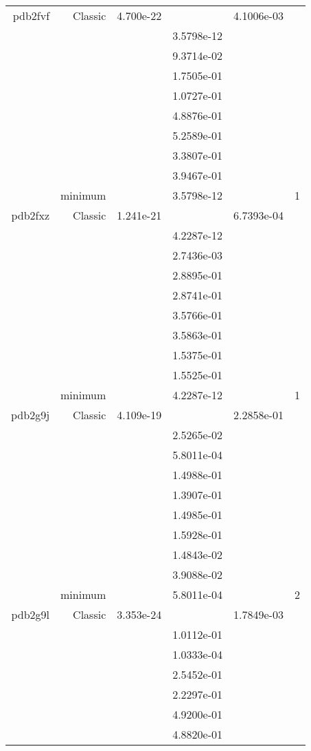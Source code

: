 \begin{xltabular}{\textwidth}{r|rS[table-format=1.3e+2]S[table-format=1.4e+2]S[table-format=1.4e+2]S[table-format=-1.5]}
pdb2fvf & Classic & 4.700e-22 &  & 4.1006e-03 & \\
&  &  & 3.5798e-12 & & \\
&  &  & 9.3714e-02 & & \\
&  &  & 1.7505e-01 & & \\
&  &  & 1.0727e-01 & & \\
&  &  & 4.8876e-01 & & \\
&  &  & 5.2589e-01 & & \\
&  &  & 3.3807e-01 & & \\
&  &  & 3.9467e-01 & & \\
& minimum &  & 3.5798e-12 & & 1 \\  \addlinespace
pdb2fxz & Classic & 1.241e-21 &  & 6.7393e-04 & \\
&  &  & 4.2287e-12 & & \\
&  &  & 2.7436e-03 & & \\
&  &  & 2.8895e-01 & & \\
&  &  & 2.8741e-01 & & \\
&  &  & 3.5766e-01 & & \\
&  &  & 3.5863e-01 & & \\
&  &  & 1.5375e-01 & & \\
&  &  & 1.5525e-01 & & \\
& minimum &  & 4.2287e-12 & & 1 \\  \addlinespace
pdb2g9j & Classic & 4.109e-19 &  & 2.2858e-01 & \\
&  &  & 2.5265e-02 & & \\
&  &  & 5.8011e-04 & & \\
&  &  & 1.4988e-01 & & \\
&  &  & 1.3907e-01 & & \\
&  &  & 1.4985e-01 & & \\
&  &  & 1.5928e-01 & & \\
&  &  & 1.4843e-02 & & \\
&  &  & 3.9088e-02 & & \\
& minimum &  & 5.8011e-04 & & 2 \\  \addlinespace
pdb2g9l & Classic & 3.353e-24 &  & 1.7849e-03 & \\
&  &  & 1.0112e-01 & & \\
&  &  & 1.0333e-04 & & \\
&  &  & 2.5452e-01 & & \\
&  &  & 2.2297e-01 & & \\
&  &  & 4.9200e-01 & & \\
&  &  & 4.8820e-01 & & \\

\end{xltabular}
